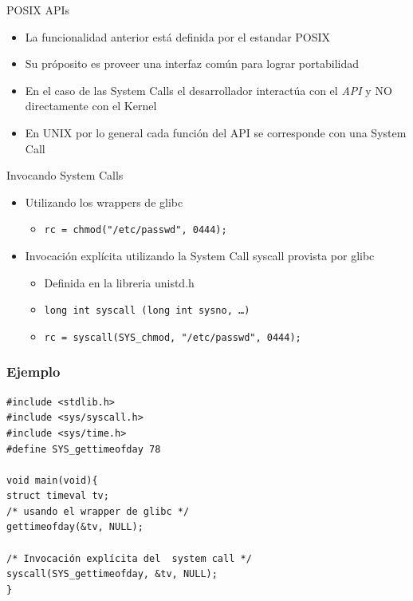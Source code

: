\begin{frame}{POSIX APIs}
  \begin{itemize}
  \item La funcionalidad anterior está definida por el estandar POSIX
  \item Su próposito es proveer una interfaz común para lograr portabilidad
  \item En el caso de las System Calls el desarrollador interactúa con el \textit{API} y NO directamente con el Kernel   
  \item En UNIX por lo general cada función del \alert{API} se corresponde con una \alert{System Call}
  \end{itemize}
 \begin{center}
   \end{center}
\end{frame}


\begin{frame}{Invocando System Calls}
  \begin{itemize}
  \item Utilizando los wrappers de glibc
         \begin{itemize}
            \item \texttt{rc = chmod("/etc/passwd", 0444);}
         \end{itemize}
  \item Invocación explícita utilizando la System Call syscall provista por glibc
         \begin{itemize}
            \item Definida en la libreria unistd.h
            \item \texttt{long int syscall (long int sysno, …) }
	    \item \texttt{rc = syscall(SYS\_chmod, "/etc/passwd", 0444);}
         \end{itemize} 
  \end{itemize}
\end{frame}


\begin{frame}[fragile]
\frametitle{Ejemplo}
\begin{lstlisting}
#include <stdlib.h>
#include <sys/syscall.h>
#include <sys/time.h>
#define SYS_gettimeofday 78

void main(void){
struct timeval tv;
/* usando el wrapper de glibc */
gettimeofday(&tv, NULL);

/* Invocación explícita del  system call */
syscall(SYS_gettimeofday, &tv, NULL);
}
\end{lstlisting}
\end{frame}


